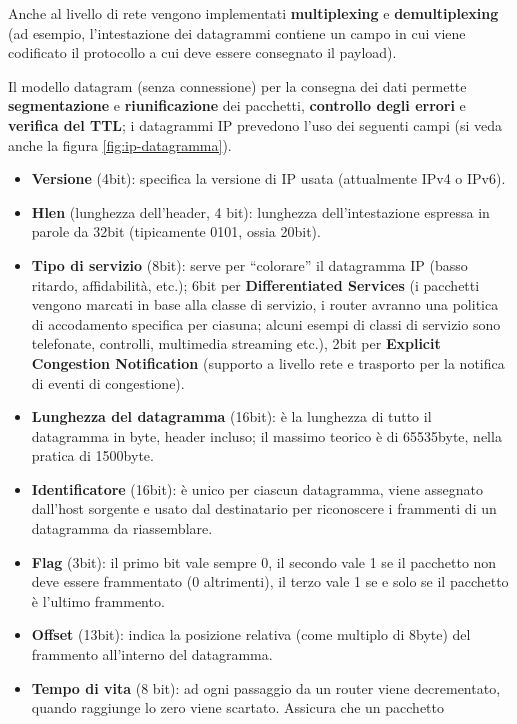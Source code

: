 \documentclass[11pt, italian, openany]{book}
\begin{document}
\begin{sloppypar}
Anche al livello di rete vengono implementati \textbf{multiplexing} e \textbf{demultiplexing} (ad esempio, l'intestazione dei datagrammi contiene un campo
in cui viene codificato il protocollo a cui deve essere consegnato il payload).

Il modello datagram (senza connessione) per la consegna dei dati permette \textbf{segmentazione} e \textbf{riunificazione} dei pacchetti, \textbf{controllo
degli errori} e \textbf{verifica del TTL}; i datagrammi IP prevedono l'uso dei seguenti campi (si veda anche la figura \ref{fig:ip-datagramma}).
\begin{itemize}[itemsep=0pt, topsep=0pt, parsep=0pt]
	\item \textbf{Versione} (4bit): specifica la versione di IP usata (attualmente IPv4 o IPv6).
	\item \textbf{Hlen} (lunghezza dell'header, 4 bit): lunghezza dell'intestazione espressa in parole da 32bit (tipicamente 0101, ossia 20bit).
	\item \textbf{Tipo di servizio} (8bit): serve per ``colorare'' il datagramma IP (basso ritardo, affidabilit\`a, etc.); 6bit per \textbf{Differentiated
	Services} (i pacchetti vengono marcati in base alla classe di servizio, i router avranno una politica di accodamento specifica per ciasuna; alcuni esempi
	di classi di servizio sono telefonate, controlli, multimedia streaming etc.), 2bit per \textbf{Explicit Congestion Notification} (supporto a livello
	rete e trasporto per la notifica di eventi di congestione).
	\item \textbf{Lunghezza del datagramma} (16bit): \`e la lunghezza di tutto il datagramma in byte, header incluso; il massimo teorico \`e di 65535byte, nella
	pratica di 1500byte.
	\item \textbf{Identificatore} (16bit): \`e unico per ciascun datagramma, viene assegnato dall'host sorgente e usato dal destinatario per riconoscere i
	frammenti di un datagramma da riassemblare.
	\item \textbf{Flag} (3bit): il primo bit vale sempre 0, il secondo vale 1 se il pacchetto non deve essere frammentato (0 altrimenti), il terzo vale 1 se e
	solo se il pacchetto \`e l'ultimo frammento.
	\item \textbf{Offset} (13bit): indica la posizione relativa (come multiplo di 8byte) del frammento all'interno del datagramma.
	\item \textbf{Tempo di vita} (8 bit): ad ogni passaggio da un router viene decrementato, quando raggiunge lo zero viene scartato. Assicura che un pacchetto

\end{itemize}
\end{sloppypar}
\end{document}
